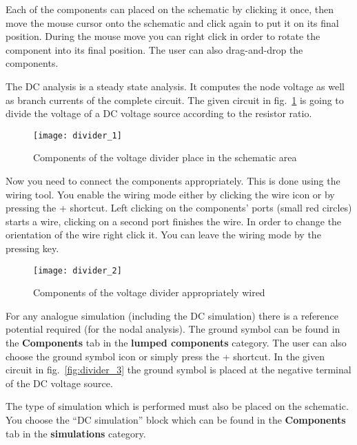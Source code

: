 Each of the components can placed on the schematic by clicking it
once, then move the mouse cursor onto the schematic and click again to
put it on its final position.  During the mouse move you can right
click in order to rotate the component into its final position.  The
user can also drag-and-drop the components.


The DC analysis is a steady state analysis.  It computes the node
voltage as well as branch currents of the complete circuit.  The given
circuit in fig.~\ref{fig:divider_1} is going to divide the voltage of
a DC voltage source according to the resistor ratio.

\begin{figure}[ht]
  \centering
  \texttt{[image: divider\_1]}
  \caption{Components of the voltage divider place in the schematic area}
  \label{fig:divider_1}
\end{figure}
\FloatBarrier


Now you need to connect the components appropriately.  This is done
using the wiring tool.  You enable the wiring mode either by clicking
the wire icon or by pressing the \Ctrl+ shortcut.  Left
clicking on the components' ports (small red circles) starts a wire,
clicking on a second port finishes the wire.  In order to change the
orientation of the wire right click it.  You can leave the wiring mode
by the pressing \Esc key.

\begin{figure}[ht]
  \centering
  \texttt{[image: divider\_2]}
  \caption{Components of the voltage divider appropriately wired}
  \label{fig:divider_2}
\end{figure}
\FloatBarrier

For any analogue simulation (including the DC simulation) there is a
reference potential required (for the nodal analysis).  The ground
symbol can be found in the \textbf{Components} tab in the
\textbf{lumped components} category.  The user can also choose the
ground symbol icon or simply press the \Ctrl+ shortcut.
In the given circuit in fig.~\ref{fig:divider_3} the ground symbol is
placed at the negative terminal of the DC voltage source.


The type of simulation which is performed must also be placed on the
schematic.  You choose the ``DC simulation'' block which can be found
in the \textbf{Components} tab in the \textbf{simulations} category.

